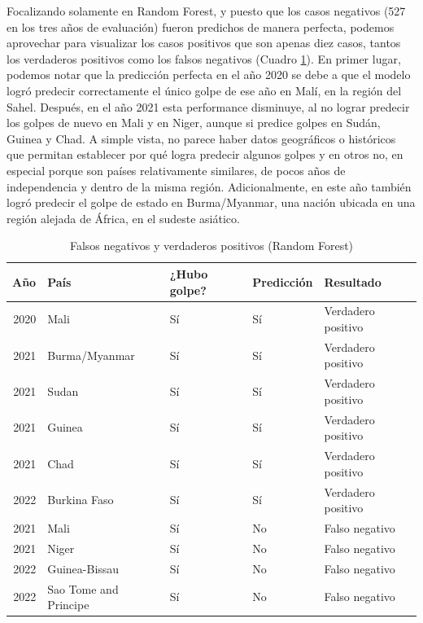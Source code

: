 \documentclass{article}
\begin{document}
Focalizando solamente en Random Forest, y puesto que los casos negativos (527 en los 
tres años de evaluación) fueron predichos de manera perfecta, podemos aprovechar para 
visualizar los casos positivos que son apenas diez casos, tantos los verdaderos 
positivos como los falsos negativos (Cuadro \ref{tab:resultados}). En primer lugar,
podemos notar que la predicción perfecta en el año 2020 se debe a que el modelo logró
predecir correctamente el único golpe de ese año en Malí, en la región del Sahel. Después, 
en el año 2021 esta performance disminuye, al no lograr predecir los golpes de nuevo en 
Mali y en Niger, aunque si predice golpes en Sudán, Guinea y Chad. A simple vista, no parece 
haber datos geográficos o históricos que permitan establecer por qué logra predecir algunos 
golpes y en otros no,
en especial porque son países relativamente similares, de pocos años de independencia y
dentro de la misma región. Adicionalmente, en este año también logró predecir el golpe de
estado en Burma/Myanmar, una nación ubicada en una región alejada de África, en el sudeste
asiático.

\begin{table}[H]
  \centering
    \begin{tabular}{rllll}
      \toprule
      Año & País & ¿Hubo golpe? & Predicción & Resultado \\
      \midrule
      2020 & Mali                  & Sí & Sí & Verdadero positivo \\
      2021 & Burma/Myanmar         & Sí & Sí & Verdadero positivo \\
      2021 & Sudan                 & Sí & Sí & Verdadero positivo \\
      2021 & Guinea                & Sí & Sí & Verdadero positivo \\
      2021 & Chad                  & Sí & Sí & Verdadero positivo \\
      2022 & Burkina Faso          & Sí & Sí & Verdadero positivo \\
      2021 & Mali                  & Sí & No & Falso negativo \\
      2021 & Niger                 & Sí & No & Falso negativo \\
      2022 & Guinea-Bissau         & Sí & No & Falso negativo \\
      2022 & Sao Tome and Principe & Sí & No & Falso negativo \\
      \bottomrule
    \end{tabular}
  \caption{Falsos negativos y verdaderos positivos (Random Forest) \label{tab:resultados}}
\end{table}
\end{document}
